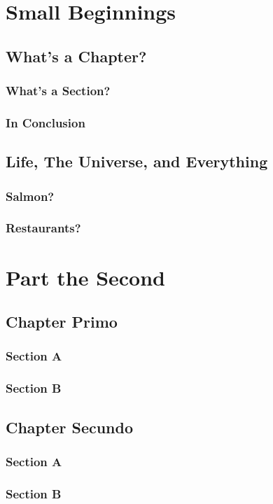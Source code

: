\documentclass{memoir}
\begin{document}
\part{Small Beginnings}
\chapter{What's a Chapter?}
\section{What's a Section?}
\lipsum
\section{In Conclusion}
\Blindtext
\chapter{Life, The Universe, and Everything}
\section{Salmon?}
\blindtext
\section{Restaurants?}
\Blindtext
\part{Part the Second}
\chapter{Chapter Primo}
\section{Section A}
\lipsum
\section{Section B}
\lipsum
\chapter{Chapter Secundo}
\section{Section A}
\lipsum
\section{Section B}
\lipsum
\end{document}
